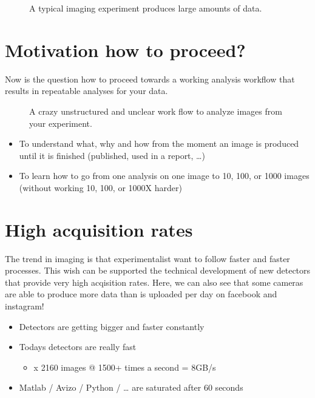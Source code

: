 \documentclass[letterpaper,10pt,english]{sphinxmanual}
\begin{document}
\begin{figure}[htbp]
\centering
\capstart

\noindent{}
\caption{A typical imaging experiment produces large amounts of data.}\label{\detokenize{01-Introduction:id8}}\end{figure}




\section{Motivation \sphinxhyphen{} how to proceed?}
\label{\detokenize{01-Introduction:motivation-how-to-proceed}}
\sphinxAtStartPar
Now is the question how to proceed towards a working analysis workflow that results in repeatable analyses for your data.

\begin{figure}[htbp]
\centering
\capstart

\noindent{}
\caption{A crazy unstructured and unclear work flow to analyze images from your experiment.}\label{\detokenize{01-Introduction:id9}}\end{figure}


\begin{itemize}
\item {} 
\sphinxAtStartPar
To understand what, why and how from the moment an image is produced until it is finished (published, used in a report, …)

\item {} 
\sphinxAtStartPar
To learn how to go from one analysis on one image to 10, 100, or 1000 images (without working 10, 100, or 1000X harder)

\end{itemize}


\section{High acquisition rates}
\label{\detokenize{01-Introduction:high-acquisition-rates}}
\sphinxAtStartPar
The trend in imaging is that experimentalist want to follow faster and faster processes. This wish can be supported the technical development of new detectors that provide very high acqisition rates. Here, we can also see that some cameras are able to produce more data than is uploaded per day on facebook and instagram!
\begin{itemize}
\item {} 
\sphinxAtStartPar
Detectors are getting bigger and faster constantly

\item {} 
\sphinxAtStartPar
Todays detectors are really fast
\begin{itemize}
\item {} 
 x 2160 images @ 1500+ times a second = 8GB/s

\end{itemize}

\item {} 
\sphinxAtStartPar
Matlab / Avizo / Python / … are saturated after 60 seconds

\end{itemize}
\end{document}
